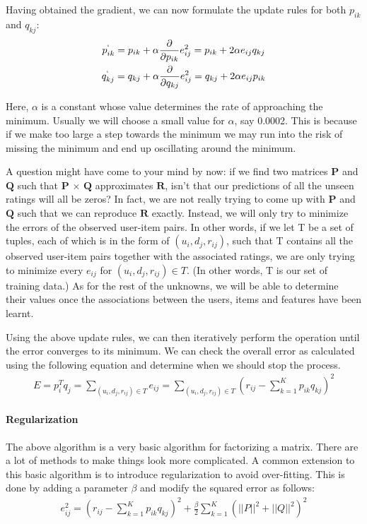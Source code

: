  Having obtained the gradient, we can now formulate the update rules for both $p_{ik}$ and $q_{kj}$:
\begin{gather*}
      p^`_{ik} = p_{ik} + \alpha\frac{\partial}{\partial p_{ik}}e_{ij}^2 = p_{ik} + 2\alpha e_{ij}q_{kj} \\
      q^`_{kj} = q_{kj} + \alpha\frac{\partial}{\partial q_{kj}}e_{ij}^2 = q_{kj} + 2\alpha e_{ij}p_{ik}
  \end{gather*}

 Here, $\alpha$ is a constant whose value determines the rate of approaching the minimum. Usually we will choose a small value for $\alpha$, say 0.0002. This is because if we make too large a step towards the minimum we may run into the risk of missing the minimum and end up oscillating around the minimum.

 A question might have come to your mind by now: if we find two matrices $\mathbf{P}$ and $\mathbf{Q}$ such that $\mathbf{P}$ $\times$ $\mathbf{Q}$ approximates $\mathbf{R}$, isn’t that our predictions of all the unseen ratings will all be zeros? In fact, we are not really trying to come up with $\mathbf{P}$ and $\mathbf{Q}$ such that we can reproduce $\mathbf{R}$ exactly. Instead, we will only try to minimize the errors of the observed user-item pairs. In other words, if we let T be a set of tuples, each of which is in the form of $(u_i, d_j, r_{ij})$, such that T contains all the observed user-item pairs together with the associated ratings, we are only trying to minimize every $e_{ij}$ for $(u_i, d_j, r_{ij}) \in T$. (In other words, T is our set of training data.) As for the rest of the unknowns, we will be able to determine their values once the associations between the users, items and features have been learnt.

 Using the above update rules, we can then iteratively perform the operation until the error converges to its minimum. We can check the overall error as calculated using the following equation and determine when we should stop the process.
  \begin{gather*}
    E = p_i^{T}q_j = \sum_{(u_i,d_j,r_{ij})\in T} e_{ij} = \sum_{(u_i,d_j,r_{ij})\in T} (r_{ij} - \sum_{k=1}^{K}p_{ik}q_{kj})^2
  \end{gather*}
\paragraph{Regularization}

 The above algorithm is a very basic algorithm for factorizing a matrix. There are a lot of methods to make things look more complicated. A common extension to this basic algorithm is to introduce regularization to avoid over-fitting. This is done by adding a parameter $\beta$ and modify the squared error as follows:
  \begin{gather*}
    e_{ij}^2 = (r_{ij} - \sum_{k=1}^{K}p_{ik}q_{kj})^2 + \frac{\beta}{2}\sum_{k=1}^{K}(||P||^2 + ||Q||^2)^2
  \end{gather*}

